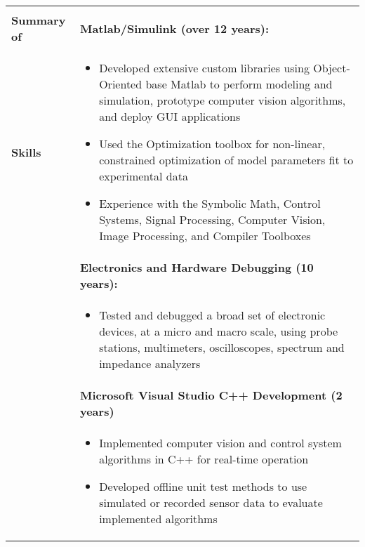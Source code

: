 \begin{tabular}{L{\hlcolw}  L{\rcolw}}
	\hline \hline \\
	\textbf{\Large Summary of } & 
	\textbf{Matlab/Simulink (over 12 years):} 
	\\
	\textbf{\Large Skills} & 
	\vspace{-0.25in}
	
	\begin{itemize}[leftmargin = \itemmargin]
		
		\item Developed extensive custom libraries using Object-Oriented base Matlab to perform modeling and simulation, prototype computer vision algorithms, and deploy GUI applications
		
		\item Used the Optimization toolbox for non-linear, constrained optimization of model parameters fit to experimental data
		
		\item Experience with the Symbolic Math, Control Systems, Signal Processing, Computer Vision, Image Processing, and Compiler Toolboxes
		
		
	\end{itemize} \\
	
	& \textbf{Electronics and Hardware Debugging (10 years):} \\
	&
	\vspace{-0.25in}
	\begin{itemize}[leftmargin = \itemmargin]
		\item Tested and debugged a broad set of electronic devices, at a micro and macro scale, using probe stations, multimeters, oscilloscopes, spectrum and impedance analyzers
	\end{itemize}
	\\
	
	& \textbf{Microsoft Visual Studio C++ Development (2 years)}\\
	&
	\vspace{-0.25in}
	\begin{itemize}[leftmargin = \itemmargin]
		\item Implemented computer vision and control system algorithms in C++ for real-time operation
		
		\item Developed offline unit test methods to use simulated or recorded sensor data to evaluate implemented algorithms
	\end{itemize} \\
	

\end{tabular}
